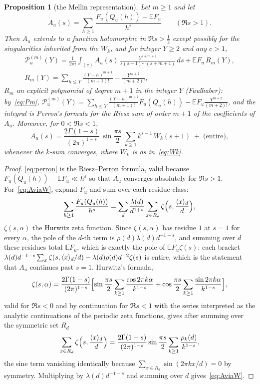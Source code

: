\documentclass[11pt,a4paper]{article}
\newtheorem{proposition}[theorem]{Proposition}
\theoremstyle{remark}\newtheorem{remark}[theorem]{Remark}
\begin{document}
\begin{proposition}[the Mellin representation]\label{prop:mellin}
Let $m\ge1$ and let
\[
A_u(s)=\sum_{h\ge1}\frac{F_u(Q_u(h))-\mathbb EF_u}{h^{s}}\qquad(\Re s>1).
\]
Then $A_u$ extends to a function holomorphic in $\Re s>\tfrac12$ except possibly for the singularities inherited from
the $W_k$, and for integer $Y\ge2$ and any $c>1$,
\begin{equation}\label{eq:perron}
\begin{gathered}
\mathcal P^{(m)}_u(Y)=\frac1{2\pi i}\int_{(c)}A_u(s)\,\frac{Y^{s+m+1}}{s(s+1)\cdots(s+m+1)}\,ds+\mathbb EF_u\,R_m(Y),\\
R_m(Y)=\sum_{h\le Y}\frac{(Y-h)^{m+1}}{(m+1)!}-\frac{Y^{m+2}}{(m+2)!},
\end{gathered}
\end{equation}
$R_m$ an explicit polynomial of degree $m+1$ in the integer $Y$ (Faulhaber): by~\eqref{eq:Pm},
$\mathcal P^{(m)}_u(Y)=\sum_{h\le Y}\frac{(Y-h)^{m+1}}{(m+1)!}F_u(Q_u(h))-\mathbb EF_u\frac{Y^{m+2}}{(m+2)!}$, and the
integral is Perron's formula for the Riesz sum of order $m+1$ of the coefficients of $A_u$.
Moreover, for $0<\Re s<1$,
\begin{equation}\label{eq:AviaW}
A_u(s)=\frac{2\Gamma(1-s)}{(2\pi)^{1-s}}\,\sin\frac{\pi s}2\;\sum_{k\ge1}k^{s-1}\,W_k(s+1)\;+\;\bigl(\text{entire}\bigr),
\end{equation}
whenever the $k$-sum converges, where $W_k$ is as in~\eqref{eq:Wk}.
\end{proposition}

\begin{proof}
\eqref{eq:perron} is the Riesz--Perron formula, valid because $F_u(Q_u(h))-\mathbb EF_u\ll h^{\varepsilon}$ so that $A_u$
converges absolutely for $\Re s>1$. For~\eqref{eq:AviaW}, expand $F_u$ and sum over each residue class:
\[
\sum_{h\ge1}\frac{F_u(Q_u(h))}{h^s}=\sum_d\frac{\lambda(d)}{d^{1+s}}\sum_{x\in R_d}\zeta\Bigl(s,\frac{\langle x\rangle_{d}}d\Bigr),
\]
$\zeta(s,\alpha)$ the Hurwitz zeta function. Since $\zeta(s,\alpha)$ has residue $1$ at $s=1$ for every $\alpha$, the
pole of the $d$-th term is $\rho(d)\lambda(d)d^{-1-s}$, and summing over $d$ these residues total $\mathbb EF_u$, which
is exactly the pole of $\mathbb EF_u\zeta(s)$: each bracket
$\lambda(d)d^{-1-s}\sum_{x}\zeta(s,\langle x\rangle_{d}/d)-\lambda(d)\rho(d)d^{-2}\zeta(s)$ is entire, which is the statement that
$A_u$ continues past $s=1$. Hurwitz's formula,
\[
\zeta(s,\alpha)=\frac{2\Gamma(1-s)}{(2\pi)^{1-s}}\Bigl[\sin\frac{\pi s}2\sum_{k\ge1}\frac{\cos2\pi k\alpha}{k^{1-s}}
+\cos\frac{\pi s}2\sum_{k\ge1}\frac{\sin2\pi k\alpha}{k^{1-s}}\Bigr],
\]
valid for $\Re s<0$ and by continuation for $\Re s<1$ with the series interpreted as the analytic continuations of the
periodic zeta functions, gives after summing over the symmetric set $R_d$
\[
\sum_{x\in R_d}\zeta\Bigl(s,\frac{\langle x\rangle_{d}}d\Bigr)=\frac{2\Gamma(1-s)}{(2\pi)^{1-s}}\sin\frac{\pi s}2\sum_{k\ge1}\frac{\rho_k(d)}{k^{1-s}},
\]
the sine term vanishing identically because $\sum_{x\in R_d}\sin(2\pi kx/d)=0$ by symmetry. Multiplying by
$\lambda(d)d^{-1-s}$ and summing over $d$ gives~\eqref{eq:AviaW}.
\end{proof}
\end{document}
